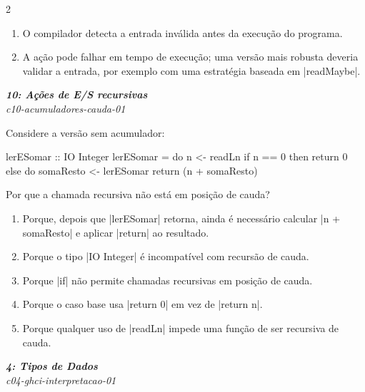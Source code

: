 \documentclass[a4paper,10pt,brazil]{article}
\begin{document}
\begin{multicols}{2}
\begin{enumerate}
  \item O compilador detecta a entrada inválida antes da execução do programa.

  \item A ação pode falhar em tempo de execução; uma versão mais robusta deveria validar a entrada, por exemplo com uma estratégia baseada em \haskellinline|readMaybe|.


\end{enumerate}

\begin{flushright}
  \footnotesize
  \textit{\textbf{10: Ações de E/S recursivas}}\\
  \textit{c10-acumuladores-cauda-01}\\

\end{flushright}
Considere a versão sem acumulador:

\begin{haskellcode}
lerESomar :: IO Integer
lerESomar = do
  n <- readLn
  if n == 0
    then return 0
    else do
      somaResto <- lerESomar
      return (n + somaResto)
\end{haskellcode}

Por que a chamada recursiva não está em posição de cauda?

\begin{enumerate}
  \item Porque, depois que \haskellinline|lerESomar| retorna, ainda é necessário calcular \haskellinline|n + somaResto| e aplicar \haskellinline|return| ao resultado.

  \item Porque o tipo \haskellinline|IO Integer| é incompatível com recursão de cauda.

  \item Porque \haskellinline|if| não permite chamadas recursivas em posição de cauda.

  \item Porque o caso base usa \haskellinline|return 0| em vez de \haskellinline|return n|.

  \item Porque qualquer uso de \haskellinline|readLn| impede uma função de ser recursiva de cauda.


\end{enumerate}

\begin{flushright}
  \footnotesize
  \textit{\textbf{4: Tipos de Dados}}\\
  \textit{c04-ghci-interpretacao-01}\\


\end{flushright}
\end{multicols}
\end{document}
